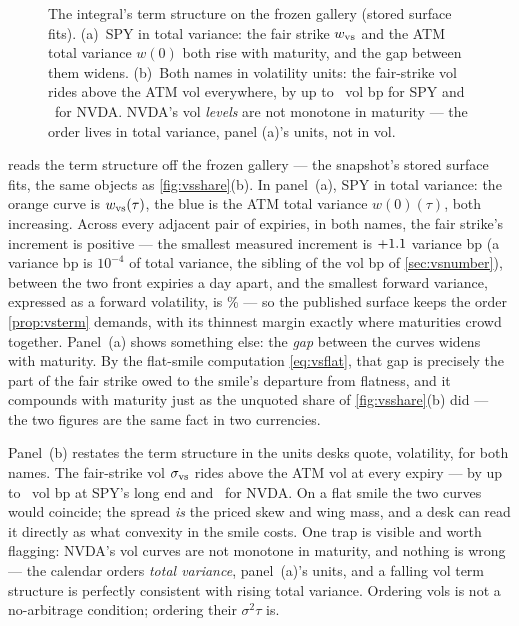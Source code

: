\begin{figure}[htbp]
\centering
{}
\caption{The integral's term structure on the frozen gallery (stored
surface fits).  (a)~SPY in total variance: the fair strike
$w_{\rm vs}$ and the ATM total variance $w(0)$ both rise with
maturity, and the gap between them widens.  (b)~Both names in
volatility units: the fair-strike vol rides above the ATM vol
everywhere, by up to \MacVsTermSpySpreadBp\ vol bp for SPY and
\MacVsTermNvdaSpreadBp\ for NVDA.  NVDA's vol \emph{levels} are not
monotone in maturity --- the order lives in total variance, panel
(a)'s units, not in vol.}
\label{fig:vsterm}
\end{figure}

 reads the term structure off the frozen gallery ---
the snapshot's stored surface fits, the same objects as
\cref{fig:vsshare}(b).  In panel~(a), SPY in total variance: the
orange curve is $w_{\rm vs}(\tau)$, the blue is the ATM total
variance $w(0)(\tau)$, both increasing.  Across every adjacent pair
of expiries, in both names, the fair strike's increment is positive
--- the smallest measured increment is $+1.1$
variance bp (a variance bp is $10^{-4}$ of total variance, the
sibling of the vol bp of \cref{sec:vsnumber}), between the two front
expiries a day apart, and the smallest forward variance, expressed as
a forward volatility, is
\MacVsTermFwdVolMinPct\% --- so the published surface keeps the order
\cref{prop:vsterm} demands, with its thinnest margin exactly where
maturities crowd together.  Panel~(a) shows something else: the
\emph{gap} between the curves widens with maturity.  By the
flat-smile computation \eqref{eq:vsflat}, that gap is precisely the
part of the fair strike owed to the smile's departure from flatness,
and it compounds with maturity just as the unquoted share of
\cref{fig:vsshare}(b) did --- the two figures are the same fact in
two currencies.

Panel~(b) restates the term structure in the units desks quote,
volatility, for both names.  The fair-strike vol $\sigma_{\rm vs}$
rides above the ATM vol at every expiry --- by up to
\MacVsTermSpySpreadBp\ vol bp at SPY's long end and
\MacVsTermNvdaSpreadBp\ for NVDA.  On a flat smile the two curves
would coincide; the spread \emph{is} the priced skew and wing mass,
and a desk can read it directly as what convexity in the smile costs.
One trap is visible and worth flagging: NVDA's vol curves are not
monotone in maturity, and nothing is wrong --- the calendar orders
\emph{total variance}, panel~(a)'s units, and a falling vol term
structure is perfectly consistent with rising total variance.
Ordering vols is not a no-arbitrage condition; ordering their
$\sigma^{2}\tau$ is.

